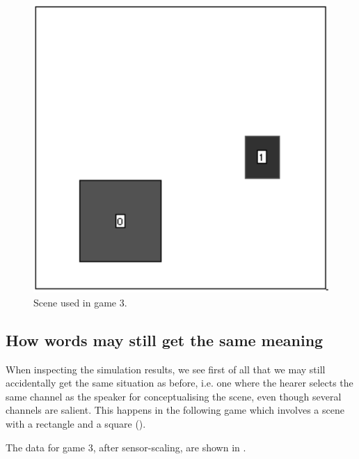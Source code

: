 \begin{figure}[htbp]
  \centerline{\includegraphics[width=.40\textwidth]{chap6/figs/scene-game3.pdf}}
\caption{\label{scene-game3}Scene used
in game 3.}
\end{figure}

\subsection{How words may still get the same meaning}

When inspecting the simulation results, we see                          
first of all that 
we may still accidentally get the same situation
as before, i.e. one where the hearer selects 
the same channel as the speaker for conceptualising 
the scene, even though several channels 
are salient. This happens in the
following game which involves a scene with a rectangle
and a square (). 

The data for game 3, after sensor-scaling,
are shown in . 


